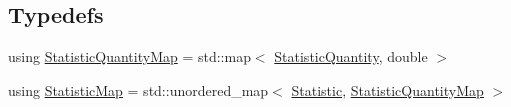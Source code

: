 \subsection*{Typedefs}
\begin{DoxyCompactItemize}
\item 
using \hyperlink{namespacevt_1_1vrt_1_1collection_1_1lb_aa3a389ff9262dd6be27791dcf037ef38}{Statistic\+Quantity\+Map} = std\+::map$<$ \hyperlink{namespacevt_1_1vrt_1_1collection_1_1lb_a74989c7b4dd16fcc067e90a29cd1febe}{Statistic\+Quantity}, double $>$
\item 
using \hyperlink{namespacevt_1_1vrt_1_1collection_1_1lb_a497ad83ef5825f2ea18ed20a228870d3}{Statistic\+Map} = std\+::unordered\+\_\+map$<$ \hyperlink{namespacevt_1_1vrt_1_1collection_1_1lb_af0e20ef9afee77295053aa83bf1348b1}{Statistic}, \hyperlink{namespacevt_1_1vrt_1_1collection_1_1lb_aa3a389ff9262dd6be27791dcf037ef38}{Statistic\+Quantity\+Map} $>$
\end{DoxyCompactItemize}
